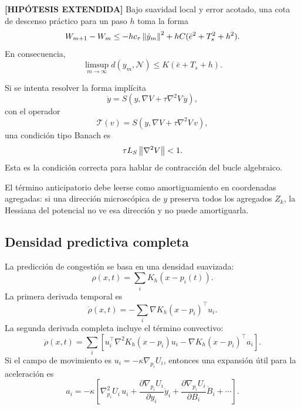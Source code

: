 \begin{proposicion}
\textbf{[HIPÓTESIS EXTENDIDA]}
Bajo suavidad local y error acotado, una cota de descenso práctico para un paso $h$ toma
la forma
\begin{equation}
  W_{m+1}-W_m
  \le
  -h c_\tau\left\|\dot y_m\right\|^2
  +
  hC(\bar e^2+T_s^2+h^2).
  \label{eq:anexo_descenso_sampled}
\end{equation}
En consecuencia,
\begin{equation}
  \limsup_{m\to\infty}d(y_m,\mathcal{N})
  \le
  K(\bar e+T_s+h).
  \label{eq:anexo_limsup_sampled}
\end{equation}
\end{proposicion}

\begin{observacion}
Si se intenta resolver la forma implícita
\[
  \dot y=S\left(y,\nabla V+\tau\nabla^2V\,\dot y\right),
\]
con el operador
\[
  \mathcal{T}(v)=S\left(y,\nabla V+\tau\nabla^2V\,v\right),
\]
una condición tipo Banach es
\begin{equation}
  \tau L_S\left\|\nabla^2V\right\|<1.
  \label{eq:anexo_contraccion_implicita}
\end{equation}
Esta es la condición correcta para hablar de contracción del bucle algebraico.
\end{observacion}

El término anticipatorio debe leerse como amortiguamiento en coordenadas agregadas:
si una dirección microscópica de $y$ preserva todos los agregados $Z_k$, la Hessiana del
potencial no ve esa dirección y no puede amortiguarla.

\subsection{Densidad predictiva completa}
\label{subsec:densidad-predictiva-completa}

La predicción de congestión se basa en una densidad suavizada:
\begin{equation}
  \rho(x,t)=\sum_i K_h(x-p_i(t)).
  \label{eq:anexo_densidad}
\end{equation}
La primera derivada temporal es
\begin{equation}
  \dot\rho(x,t)
  =
  -\sum_i\nabla K_h(x-p_i)^\top u_i.
  \label{eq:anexo_densidad_dot}
\end{equation}
La segunda derivada completa incluye el término convectivo:
\begin{equation}
  \ddot\rho(x,t)
  =
  \sum_i
  \left[
    u_i^\top\nabla^2K_h(x-p_i)u_i
    -
    \nabla K_h(x-p_i)^\top a_i
  \right].
  \label{eq:anexo_densidad_ddot}
\end{equation}
Si el campo de movimiento es $u_i=-\kappa\nabla_{p_i}U_i$, entonces una expansión útil
para la aceleración es
\begin{equation}
  a_i=
  -\kappa
  \left[
    \nabla_{p_i}^2U_i\,u_i
    +
    \frac{\partial\nabla_{p_i}U_i}{\partial y_i}\dot y_i
    +
    \frac{\partial\nabla_{p_i}U_i}{\partial B_i}\dot B_i
    +\cdots
  \right].
  \label{eq:anexo_aceleracion_campo}
\end{equation}

